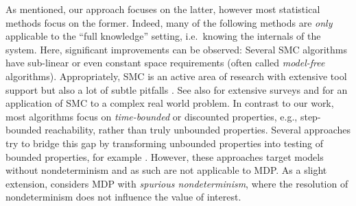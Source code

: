 \documentclass{article}
\begin{document}
As mentioned, our approach focuses on the latter, however most statistical methods focus on the former.
Indeed, many of the following methods are \emph{only} applicable to the \enquote{full knowledge} setting, i.e.\ knowing the internals of the system.
Here, significant improvements can be observed:
Several SMC algorithms have sub-linear or even constant space requirements (often called \emph{model-free} algorithms).
Appropriately, SMC is an active area of research with extensive tool support \cite{DBLP:conf/tacas/JegourelLS12,DBLP:conf/mmb/BogdollHH12,DBLP:conf/qest/BoyerCLS13,DBLP:journals/corr/abs-1207-1272,DBLP:conf/cav/DavidLLMW11,DBLP:conf/cav/Younes05a,DBLP:conf/qest/SenVA05,wats} but also a lot of subtle pitfalls \cite{DBLP:journals/sigmobile/KurkowskiCC05}.
See also \cite{DBLP:conf/isola/Kretinsky16,DBLP:journals/tomacs/AghaP18,DBLP:series/lncs/LegayLTYSG19} for extensive surveys and \cite{DBLP:conf/hybrid/RoohiW0D017} for an application of SMC to a complex real world problem.
In contrast to our work, most algorithms focus on \emph{time-bounded} or discounted properties, e.g., step-bounded reachability, rather than truly unbounded properties.
Several approaches try to bridge this gap by transforming unbounded properties into testing of bounded properties, for example \cite{DBLP:conf/sbmf/YounesCZ10,DBLP:conf/kbse/HeJBGW10,DBLP:conf/atva/RabihP09,DBLP:conf/cav/SenVA05}.
However, these approaches target models without nondeterminism and as such are not applicable to MDP.
As a slight extension, \cite{DBLP:conf/forte/BogdollFHH11} considers MDP with \emph{spurious nondeterminism}, where the resolution of nondeterminism does not influence the value of interest.
\end{document}
